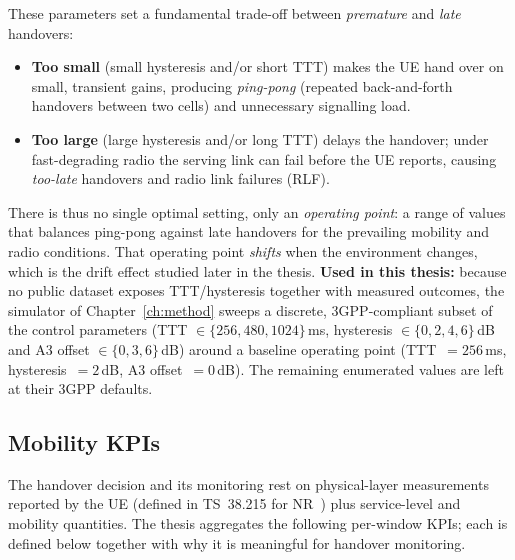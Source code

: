 These parameters set a fundamental trade-off between \emph{premature} and
\emph{late} handovers:
\begin{itemize}
  \item \textbf{Too small} (small hysteresis and/or short TTT) makes the UE
  hand over on small, transient gains, producing \emph{ping-pong} (repeated
  back-and-forth handovers between two cells) and unnecessary signalling load.
  \item \textbf{Too large} (large hysteresis and/or long TTT) delays the
  handover; under fast-degrading radio the serving link can fail before the UE
  reports, causing \emph{too-late} handovers and radio link failures (RLF).
\end{itemize}
There is thus no single optimal setting, only an \emph{operating point}: a range
of values that balances ping-pong against late handovers for the prevailing
mobility and radio conditions. That operating point \emph{shifts} when the
environment changes, which is the drift effect studied later in the thesis. \textbf{Used in this thesis:} because no public dataset exposes
TTT/hysteresis together with measured outcomes, the simulator of
Chapter~\ref{ch:method} sweeps a discrete, 3GPP-compliant subset of the control
parameters (TTT $\in\{256, 480, 1024\}$\,ms, hysteresis $\in\{0, 2, 4, 6\}$\,dB
and A3 offset $\in\{0, 3, 6\}$\,dB) around a baseline operating point
(TTT~$=256$\,ms, hysteresis~$=2$\,dB, A3 offset~$=0$\,dB). The remaining
enumerated values are left at their 3GPP defaults.

\subsection{Mobility KPIs}
\label{subsec:ho-kpis}

The handover decision and its monitoring rest on physical-layer measurements
reported by the UE (defined in TS~38.215 for NR~\cite{ts38215}) plus
service-level and mobility quantities. The thesis aggregates the following
per-window KPIs; each is defined below together with why it is meaningful for
handover monitoring.


